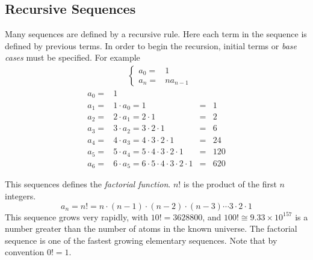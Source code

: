
\subsection*{Recursive Sequences}

Many sequences are defined by a recursive rule. Here each term in the sequence is defined by previous terms. In order to begin the recursion, initial terms or \emph{base cases} must be specified. For example
\begin{align*}
  &\begin{cases}
    a_0=&1\\
    a_n=&n a_{n-1}
  \end{cases}
\end{align*}
\begin{align*}
  a_0=&1   & &\\
  a_1=&1 \cdot a_0 = 1 &=&1  \\
  a_2=&2 \cdot a_1 = 2 \cdot 1 &=&2  \\
  a_3=&3 \cdot a_2 = 3 \cdot 2 \cdot 1 &=&6  \\
  a_4=&4 \cdot a_3 = 4 \cdot 3 \cdot 2 \cdot 1 &=&24  \\
  a_5=&5 \cdot a_4 = 5 \cdot 4 \cdot 3 \cdot 2 \cdot 1 &=&120  \\
  a_6=&6 \cdot a_5 = 6 \cdot 5 \cdot 4 \cdot 3 \cdot 2 \cdot 1 &=&620
\end{align*}

This sequences defines the \emph{factorial function}. $n!$ is the product of the first $n$ integers.
\[ a_n = n! = n \cdot (n-1) \cdot \left( n-2 \right) \cdot \left( n-3 \right) \cdots 3 \cdot 2 \cdot 1 \]
This sequence grows very rapidly, with $10!=3628800$, and $100! \cong 9.33 \times 10 ^{157}$ is a number greater than the number of atoms in the known universe. The factorial sequence is one of the fastest growing elementary sequences. Note that by convention $0!=1$.

